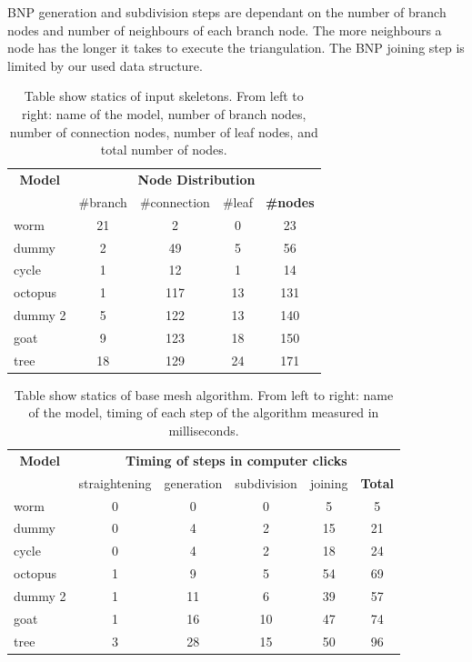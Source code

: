 BNP generation and subdivision steps are dependant on the number of branch nodes and number of neighbours of each branch node.
The more neighbours a node has the longer it takes to execute the triangulation.
The BNP joining step is limited by our used data structure.


\begin{table}[h]
\centering
\begin{tabular}{l|ccc||c}\hline
\multicolumn{1}{c}{\textbf{Model}} & \multicolumn{4}{c}{\textbf{Node Distribution}} \\
   & \#branch & \#connection & \#leaf & \textbf{\#nodes} \\ \hline
  worm & 21 & 2 & 0 & 23 \\
  dummy & 2 & 49 & 5 & 56 \\
  cycle & 1 & 12 & 1 & 14 \\
  octopus & 1 & 117 & 13 & 131 \\
  dummy 2 & 5 & 122 & 13 & 140 \\
  goat & 9 & 123 & 18 & 150 \\
  tree & 18 & 129 & 24 & 171 \\ \hline
\end{tabular}
\caption[Table show statics of input skeletons]{Table show statics of input skeletons. From left to right: name of the model, number of branch nodes, number of connection nodes, number of leaf nodes, and total number of nodes.}
\label{tab:models}
\end{table}

\begin{table}[h]
\centering
\begin{tabular}{l|cccc||c}\hline
\multicolumn{1}{c}{\textbf{Model}} & \multicolumn{5}{c}{\textbf{Timing of steps in computer clicks}} \\
   & straightening & generation & subdivision & joining & \textbf{Total} \\ \hline
  worm & 0 & 0 & 0 & 5 & 5 \\
  dummy & 0 & 4 & 2 & 15 & 21 \\
  cycle & 0 & 4 & 2 & 18 & 24 \\
  octopus & 1 & 9 & 5 & 54 & 69 \\
  dummy 2 & 1 & 11 & 6 & 39 & 57 \\
  goat & 1 & 16 & 10 & 47 & 74 \\
  tree & 3 & 28 & 15 & 50 & 96 \\ \hline
\end{tabular}
\caption[Table show statics of base mesh algorithm]{Table show statics of base mesh algorithm. From left to right: name of the model, timing of each step of the algorithm measured in milliseconds.}
\label{tab:results}
\end{table}